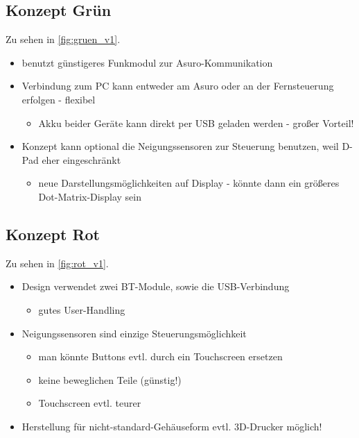 \subsection{Konzept Grün}
Zu sehen in \autoref{fig:gruen_v1}.
\begin{itemize}
	\item benutzt günstigeres Funkmodul zur Asuro-Kommunikation
	\item Verbindung zum PC kann entweder am Asuro oder an der Fernsteuerung erfolgen - flexibel
	\begin{itemize}
		\item Akku beider Geräte kann direkt per USB geladen werden - großer Vorteil!
	\end{itemize}
	\item Konzept kann optional die Neigungssensoren zur Steuerung benutzen, weil D-Pad eher eingeschränkt
	\begin{itemize}
		\item neue Darstellungsmöglichkeiten auf Display - könnte dann ein größeres Dot-Matrix-Display sein
	\end{itemize}
\end{itemize}

\subsection{Konzept Rot}
Zu sehen in \autoref{fig:rot_v1}.
\begin{itemize}
	\item Design verwendet zwei BT-Module, sowie die USB-Verbindung
	\begin{itemize}
		\item gutes User-Handling
	\end{itemize}
	\item Neigungssensoren sind einzige Steuerungsmöglichkeit
	\begin{itemize}
		\item man könnte Buttons evtl. durch ein Touchscreen ersetzen
		\item keine beweglichen Teile (günstig!)
		\item Touchscreen evtl. teurer
	\end{itemize}
	\item Herstellung für nicht-standard-Gehäuseform evtl. 3D-Drucker möglich!
\end{itemize}
